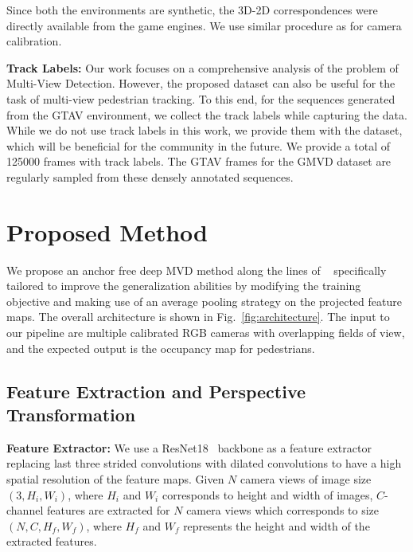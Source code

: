 \documentclass[letterpaper, 10 pt, conference]{ieeeconf}  \usepackage{times}
\begin{document}
Since both the environments are synthetic, the 3D-2D correspondences were directly available from the game engines. We use similar procedure as \cite{hou2020multiview} for camera calibration.

\textbf{Track Labels:} Our work focuses on a comprehensive analysis of the problem of Multi-View Detection. However, the proposed dataset can also be useful for the task of multi-view pedestrian tracking. To this end, for the sequences generated from the GTAV environment, we collect the track labels while capturing the data. While we do not use track labels in this work, we provide them with the dataset, which will be beneficial for the community in the future. We provide a total of 125000 frames with track labels. The GTAV frames for the GMVD dataset are regularly sampled from these densely annotated sequences. 


















\section{Proposed Method}
\label{sec:method}
 We propose an anchor free deep MVD method along the lines of ~\cite{hou2020multiview,hou2021multiview,song2021stacked} specifically tailored to improve the generalization abilities by modifying the training objective and making use of an average pooling strategy on the projected feature maps. The overall architecture is shown in Fig.~\ref{fig:architecture}. The input to our pipeline are multiple calibrated RGB cameras with overlapping fields of view, and the expected output is the occupancy map for pedestrians.
\subsection{Feature Extraction and Perspective Transformation}
\textbf{Feature Extractor:} We use a ResNet18~\cite{He2016DeepRL} backbone as a feature extractor replacing last three strided convolutions with dilated convolutions to have a high spatial resolution of the feature maps. Given $N$ camera views of image size $(3, H_i, W_i)$, where $H_i$ and $W_i$ corresponds to height and width of images, $C$-channel features are extracted for $N$ camera views which corresponds to size $(N, C, H_f, W_f)$, where $H_f$ and $W_f$ represents the  height and width of the extracted features.
\end{document}
